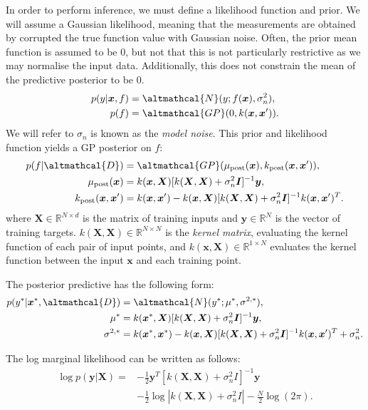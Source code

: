 \documentclass[a4paper, twocolumn, 10pt]{article}
\begin{document}
In order to perform inference, we must define a likelihood function and prior. We will assume a Gaussian likelihood, meaning that the measurements are obtained by corrupted the true function value with Gaussian noise. Often, the prior mean function is assumed to be $0$, but not that this is not particularly restrictive as we may normalise the input data. Additionally, this does not constrain the mean of the predictive posterior to be $0$.
\begin{align}
p(y | \bm{x}, f) &= \altmathcal{N}(y; f(\bm{x}), \sigma_n^2), \\
p(f) &= \altmathcal{GP}(0, k(\bm{x}, \bm{x}')).
\end{align}
We will refer to $\sigma_n$ is known as the \emph{model noise}. This prior and likelihood function yields a GP posterior on $f$:
\begin{align}
p(f | \altmathcal{D}) &= \altmathcal{GP}(\mu_\text{post}(\bm{x}), k_\text{post}(\bm{x}, \bm{x}')), \\
\mu_\text{post}(\bm{x}) &= k(\bm{x}, \bm{X}) [ k(\bm{X}, \bm{X}) + \sigma_n^2 \bm{I}]^{-1} \bm{y}, \\
k_\text{post}(\bm{x}, \bm{x}') &= k(\bm{x}, \bm{x}') - k(\bm{x}, \bm{X}) [ k(\bm{X}, \bm{X}) + \sigma_n^2 \bm{I}]^{-1} k(\bm{x}, \bm{x}') ^ T.
\end{align}
where $\bm{X} \in \mathbb{R}^{N \times d}$ is the matrix of training inputs and $\bm{y} \in \mathbb{R}^N$ is the vector of training targets. $k(\bm{X}, \bm{X}) \in \mathbb{R}^{N \times N}$ is the \emph{kernel matrix}, evaluating the kernel function of each pair of input points, and $k(\bm{x}, \bm{X}) \in \mathbb{R}^{1 \times N}$ evaluates the kernel function between the input $\bm{x}$ and each training point. 

The posterior predictive has the following form:
\begin{align}
p(y^* | \bm{x}^*, \altmathcal{D}) &= \altmathcal{N}(y^*; \mu^*, \sigma^{2,*} ), \\ 
\mu^* &= k(\bm{x}^*, \bm{X}) [ k(\bm{X}, \bm{X}) + \sigma_n^2 \bm{I}]^{-1} \bm{y}, \\
\sigma^{2, *} &= k(\bm{x}^*, \bm{x}^*) - k(\bm{x}, \bm{X}) [ k(\bm{X}, \bm{X}) + \sigma_n^2 \bm{I}]^{-1} k(\bm{x}, \bm{x}') ^ T  + \sigma_n^2.
\end{align}

The log marginal likelihood can be written as follows:
\begin{align}
\log p(\bm{y}| \bm{X}) = &- \frac{1}{2} \bm{y}^T [k(\bm{X}, \bm{X}) + \sigma_n^2 I]^{-1} \bm{y}  \\ &- \frac{1}{2} \log | k(\bm{X}, \bm{X}) + \sigma_n^2 I|  - \frac{N}{2} \log (2\pi).
\end{align}
\end{document}
